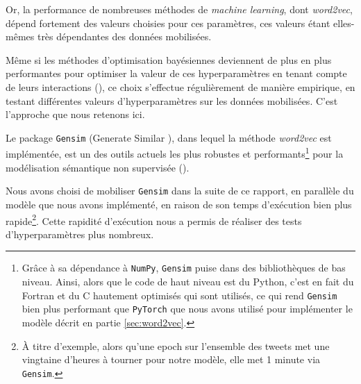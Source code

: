 \documentclass[11pt,french,french]{article}
\let\rmarkdownfootnote\footnote%
\def\footnote{\protect\rmarkdownfootnote}
\begin{document}
Or, la performance de nombreuses méthodes de \emph{machine learning},
dont \emph{word2vec}, dépend fortement des valeurs choisies pour ces
paramètres, ces valeurs étant elles-mêmes très dépendantes des données
mobilisées.

Même si les méthodes d'optimisation bayésiennes deviennent de plus en
plus performantes pour optimiser la valeur de ces hyperparamètres en
tenant compte de leurs interactions (\cite{Hutter}), ce choix s'effectue
régulièrement de manière empirique, en testant différentes valeurs
d'hyperparamètres sur les données mobilisées. C'est l'approche que nous
retenons ici.

Le package \texttt{Gensim} (\og Generate Similar \fg{}), dans lequel la
méthode \emph{word2vec} est implémentée, est un des outils actuels les
plus robustes et performants\footnote{Grâce à sa dépendance à
  \texttt{NumPy}, \texttt{Gensim} puise dans des bibliothèques de bas
  niveau. Ainsi, alors que le code de haut niveau est du Python, c'est
  en fait du Fortran et du C hautement optimisés qui sont utilisés, ce
  qui rend \texttt{Gensim} bien plus performant que \texttt{PyTorch} que
  nous avons utilisé pour implémenter le modèle décrit en partie
  \ref{sec:word2vec}.} pour la modélisation sémantique non supervisée
(\cite{Rehurek}).

Nous avons choisi de mobiliser \texttt{Gensim} dans la suite de ce
rapport, en parallèle du modèle que nous avons implémenté, en raison de
son temps d'exécution bien plus rapide\footnote{À titre d'exemple, alors
  qu'une epoch sur l'ensemble des tweets met une vingtaine d'heures à
  tourner pour \og notre \fg{} modèle, elle met 1 minute via
  \texttt{Gensim}.}. Cette rapidité d'exécution nous a permis de
réaliser des tests d'hyperparamètres plus nombreux.
\end{document}
